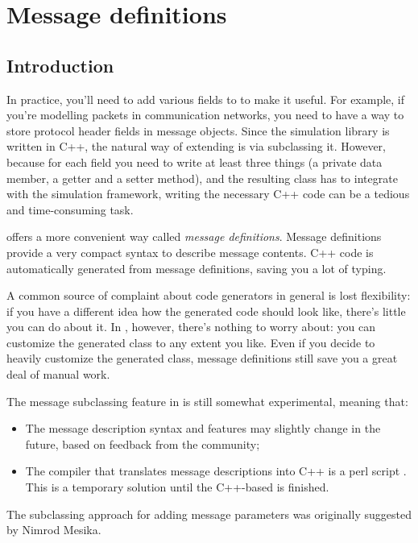 \section{Message definitions}
\label{ch:messages:message-definitions}

\subsection{Introduction}

In practice, you'll need to add various fields to  to
make it useful. For example, if you're modelling packets in communication
networks, you need to have a way to store protocol header fields in message
objects. Since the simulation library is written in C++, the natural way
of extending  is via subclassing it.
However, because for each field you need to write at least
three things (a private data member, a getter and a setter method),
and the resulting class has to integrate with the simulation framework,
writing the necessary C++ code can be a tedious and time-consuming task.

{\opp} offers a more convenient way called \textit{message definitions}.
Message definitions provide a very compact syntax to describe
message contents. C++ code is automatically generated from message
definitions, saving you a lot of typing.

A common source of complaint about code generators in general is
lost flexibility: if you have a different idea how the generated
code should look like, there's little you can do about it.
In {\opp}, however, there's nothing to worry about: you can
customize the generated class to any extent you like.
Even if you decide to heavily customize the generated class,
message definitions still save you a great deal of manual work.

The message subclassing feature in {\opp} is still somewhat experimental,
meaning that:

\begin{itemize}
  \item The message description syntax and features may slightly change
    in the future, based on feedback from the community;
  \item The compiler that translates message descriptions into C++ is
    a perl script . This is a temporary solution until
    the C++-based  is finished.
\end{itemize}

The subclassing approach for adding message parameters was originally
suggested by Nimrod Mesika.


